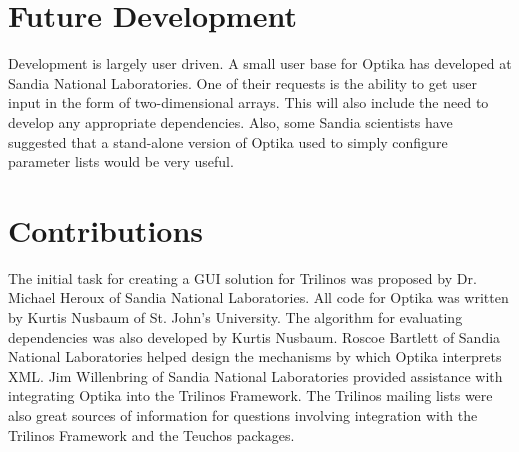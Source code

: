 \section{Future Development}
Development is largely user driven. A small user base for Optika has developed at Sandia National Laboratories. One of their requests is the ability to get user input in the 
form of two-dimensional arrays. This will also include the need to develop any appropriate dependencies. Also, some Sandia scientists have suggested that a stand-alone version 
of Optika used to simply configure parameter lists would be very useful. 

\section{Contributions}
The initial task for creating a GUI solution for Trilinos was proposed by Dr. Michael Heroux of Sandia National Laboratories. All code for Optika was written by Kurtis Nusbaum of
St. John's University. The algorithm for evaluating dependencies was also developed by Kurtis Nusbaum. 
Roscoe Bartlett of Sandia National Laboratories helped design the mechanisms by which Optika interprets XML. Jim Willenbring of Sandia National Laboratories
provided assistance with integrating Optika into the Trilinos Framework. The Trilinos mailing lists were also great sources of information for questions involving integration 
with the Trilinos Framework and the Teuchos packages.
